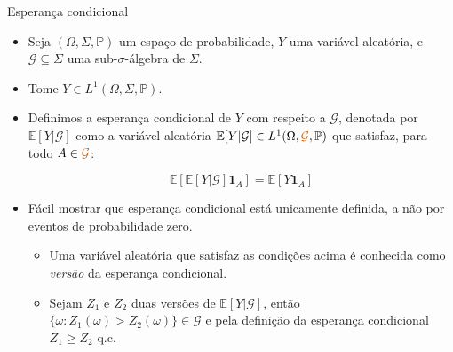 \documentclass[11pt]{beamer}
\begin{document}
	\begin{frame}{Esperança condicional}
	\begin{itemize}
		\item Seja $(\Omega, \Sigma,\mathbb{P})$ um espaço de probabilidade, $Y$ uma variável aleatória, e $\mathcal{G}\subseteq \Sigma$ uma sub-$\sigma$-álgebra de $\Sigma$.
		\item Tome $Y \in L^1(\Omega, \Sigma,\mathbb{P})$.
		\item Definimos a esperança condicional de $Y$ com respeito a $\mathcal{G}$, denotada por $\mathbb{E}[Y|\mathcal{G}]$ como a {\color{blue}variável aleatória} $\mathbb{E}[Y|\mathcal{G}] \in L^1(\Omega, {\color{red}\mathcal{G}},\mathbb{P})$  que satisfaz, para todo $A \in {\color{red}\mathcal{G}}$:
		
		$$\mathbb{E}[\mathbb{E}[Y|\mathcal{G}]\mathbf{1}_A] = \mathbb{E}[Y\mathbf{1}_A]$$
		\item Fácil mostrar que esperança condicional está unicamente definida, a não por eventos de probabilidade zero.
		\begin{itemize}
			\item Uma variável aleatória que satisfaz as condições acima é conhecida como \emph{versão} da esperança condicional.
			\item Sejam $Z_1$ e $Z_2$ duas versões de $\mathbb{E}[Y|\mathcal{G}]$, então $\{\omega: Z_1(\omega)>Z_2(\omega)\} \in \mathcal{G}$ e pela definição da esperança condicional $Z_1\geq Z_2$ q.c.
		\end{itemize}
	\end{itemize}
	\end{frame}
\end{document}
